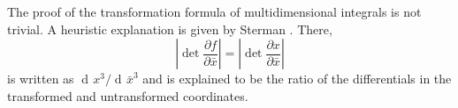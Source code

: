 \documentclass[prb,preprint]{revtex4-1}
\DeclareMathOperator{\dd}{d\!}
\begin{document}
The proof of the transformation formula of multidimensional integrals is not trivial.
A heuristic explanation is given by Sterman \cite{Sterman}.
There,
\begin{equation}
\left|\det \frac{\partial f}{\partial \bar{x}} \right| =  \left|\det \frac{\partial x}{\partial \bar{x}} \right|
\end{equation}
is written as $\dd x^3 / \dd \bar{x}^3$ and is explained to be the ratio of the differentials in the transformed and untransformed coordinates.





%
%
%
%
%
%
%
\end{document}
